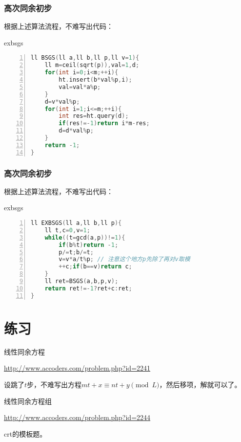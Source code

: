 \documentclass{ctexbeamer}        %
\begin{document}
\begin{frame}[fragile]
\frametitle{高次同余初步}

根据上述算法流程，不难写出代码：
\begin{block}{exbsgs}
\begin{lstlisting}[language={c++},
                   numbers=left]
ll BSGS(ll a,ll b,ll p,ll v=1){
    ll m=ceil(sqrt(p)),val=1,d;
    for(int i=0;i<m;++i){
        ht.insert(b*val%p,i);
        val=val*a%p;
    }
    d=v*val%p;
    for(int i=1;i<=m;++i){
        int res=ht.query(d);
        if(res!=-1)return i*m-res;
        d=d*val%p;
    }
    return -1;
}
\end{lstlisting}
\end{block}
\end{frame}

\begin{frame}[fragile]
\frametitle{高次同余初步}

根据上述算法流程，不难写出代码：
\begin{block}{exbsgs}
\begin{lstlisting}[language={c++},
                   numbers=left]
ll EXBSGS(ll a,ll b,ll p){
    ll t,c=0,v=1;
    while((t=gcd(a,p))!=1){
        if(b%t)return -1;
        p/=t;b/=t;
        v=v*a/t%p; // 注意这个地方p先除了再对v取模
        ++c;if(b==v)return c;
    }
    ll ret=BSGS(a,b,p,v);
    return ret!=-1?ret+c:ret;
}
\end{lstlisting}
\end{block}
\end{frame}

\section{练习}

\begin{frame}{线性同余方程}
\begin{example}[accoders2241]
    \url{http://www.accoders.com/problem.php?id=2241}
\end{example}
\pause
设跳了$t$步，不难写出方程$mt+x\equiv nt+y \pmod L$，然后移项，解就可以了。
\end{frame}

\begin{frame}{线性同余方程组}
\begin{example}[accoders2244]
    \url{http://www.accoders.com/problem.php?id=2244}
\end{example}
crt的模板题。
\end{frame}
\end{document}
